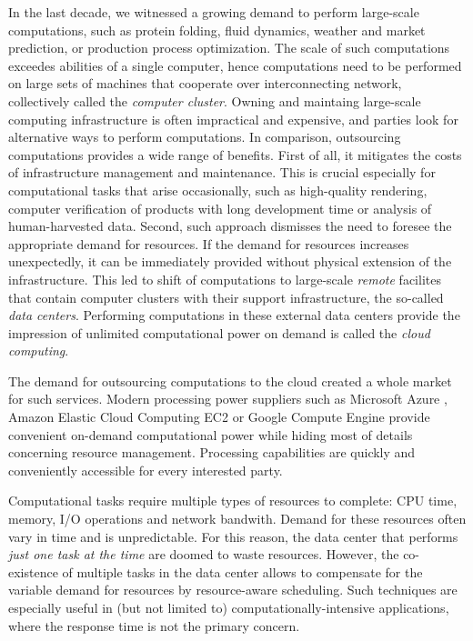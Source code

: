 \indent
In the last decade, we witnessed a growing demand to perform large-scale
computations, such as protein folding, fluid dynamics, weather and market prediction, or production process optimization.
The scale of such computations exceedes abilities of a single computer, hence computations need to be performed on large sets of machines that cooperate over interconnecting network, collectively called the \emph{computer cluster}.
Owning and maintaing large-scale computing infrastructure is often impractical and expensive, and parties look for alternative ways to perform computations.
In comparison, outsourcing computations provides a wide range of benefits.
First of all, it mitigates the costs of infrastructure management and maintenance.
This is crucial especially for computational tasks that arise occasionally, such as high-quality rendering, computer verification of products with long development time or analysis of human-harvested data.
Second, such approach dismisses the need to foresee the appropriate demand for resources.
If the demand for resources increases unexpectedly, it can be immediately provided without physical extension of the infrastructure.
This led to shift of computations to large-scale \emph{remote} facilites that contain computer clusters with their support infrastructure, the so-called \emph{data centers}.
Performing computations in these external data centers provide the impression of unlimited computational power on demand is called the \emph{cloud computing}.

The demand for outsourcing computations to the cloud created a whole market for such services.
Modern processing power suppliers such as Microsoft Azure \cite{url-azure}, Amazon Elastic Cloud Computing EC2 \cite{url-amazon-ec2} or Google Compute Engine \cite{url-gce} provide convenient on-demand computational power while hiding most of details concerning resource management.
Processing capabilities are quickly and conveniently accessible for every interested party.

Computational tasks require multiple types of resources to complete: CPU time, memory, I/O operations and network bandwith.
Demand for these resources often vary in time and is unpredictable.
For this reason, the data center that performs \emph{just one task at the time} are doomed to waste resources.
However, the co-existence of multiple tasks in the data center allows to compensate for the variable demand for resources by resource-aware scheduling.
Such techniques are especially useful in (but not limited to) computationally-intensive applications, where the response time is not the primary concern.

